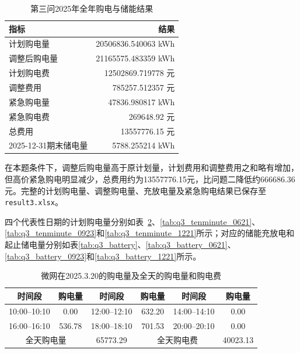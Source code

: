 \documentclass[UTF8]{ctexart}
\begin{document}
    \begin{table}[htbp]
        \centering
        \caption{第三问2025年全年购电与储能结果}
        \label{tab:q3_total}
        \begin{tabular}{lr}
            \toprule
            指标 & 结果\\
            \midrule
            计划购电量 & 20506836.540063 kWh\\
            调整后购电量 & 21165575.483359 kWh\\
            计划购电费 & 12502869.719778 元\\
            调整费用 & 785257.512357 元\\
            紧急购电量 & 47836.980817 kWh\\
            紧急购电费 & 269648.92 元\\
            总费用 & 13557776.15 元\\
            2025-12-31期末储电量 & 5788.255214 kWh\\
            \bottomrule
        \end{tabular}
    \end{table}
    
    在本题条件下，调整后购电量高于原计划量，计划费用和调整费用之和略有增加，但高价紧急购电明显减少，总费用约为13557776.15元，比问题二降低约666686.36元。完整的计划购电量、调整购电量、充放电量及紧急购电结果已保存至\texttt{result3.xlsx}。\par
    
    四个代表性日期的计划购电量分别如表~\ref{tab:q3_tenminute}、\ref{tab:q3_tenminute_0621}、\ref{tab:q3_tenminute_0923}和\ref{tab:q3_tenminute_1221}所示；对应的储能充放电和起止储电量分别如表\ref{tab:q3_battery}、\ref{tab:q3_battery_0621}、\ref{tab:q3_battery_0923}和\ref{tab:q3_battery_1221}所示。
    
    \begin{table}[htbp]
        \centering
        \caption{微网在2025.3.20的购电量及全天的购电量和购电费}
        \label{tab:q3_tenminute}
        
        \begin{tabular}{cccccc}
            \toprule
            时间段 & 购电量 & 时间段 & 购电量 & 时间段 & 购电量 \\
            \midrule
            
            10:00--10:10 & 0.00 &
            12:00--12:10 & 632.20 &
            14:00--14:10 & 0.00 \\
            
            16:00--16:10 & 536.78 &
            18:00--18:10 & 701.53 &
            20:00--20:10 & 0.00 \\
            
            \midrule
            \multicolumn{2}{c}{全天购电量} &
            65773.29 &
            \multicolumn{2}{c}{全天购电费} &
            40023.13 \\
            \bottomrule
        \end{tabular}
    \end{table}
    
\end{document}
